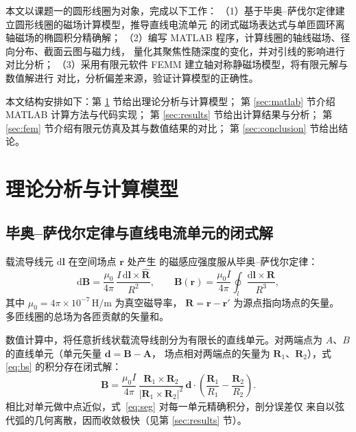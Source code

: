 \documentclass[zihao=-4,a4paper]{ctexart}
\numberwithin{figure}{section}
\numberwithin{table}{section}
\numberwithin{equation}{section}
\begin{document}
本文以课题一的圆形线圈为对象，完成以下工作：
（1）基于毕奥--萨伐尔定律建立圆形线圈的磁场计算模型，推导直线电流单元
的闭式磁场表达式与单匝圆环离轴磁场的椭圆积分精确解；
（2）编写 MATLAB 程序，计算线圈的轴线磁场、径向分布、截面云图与磁力线，
量化其聚焦性随深度的变化，并对引线的影响进行对比分析；
（3）采用有限元软件 FEMM 建立轴对称静磁场模型，将有限元解与数值解进行
对比，分析偏差来源，验证计算模型的正确性。

本文结构安排如下：第 \ref{sec:model} 节给出理论分析与计算模型；
第 \ref{sec:matlab} 节介绍 MATLAB 计算方法与代码实现；
第 \ref{sec:results} 节给出计算结果与分析；
第 \ref{sec:fem} 节介绍有限元仿真及其与数值结果的对比；
第 \ref{sec:conclusion} 节给出结论。

\clearpage
\section{理论分析与计算模型}\label{sec:model}

\subsection{毕奥--萨伐尔定律与直线电流单元的闭式解}

载流导线元 $\mathrm{d}\boldsymbol{l}$ 在空间场点 $\boldsymbol{r}$ 处产生
的磁感应强度服从毕奥--萨伐尔定律：
\begin{equation}
  \mathrm{d}\boldsymbol{B}
  = \frac{\mu_0}{4\pi}\,\frac{I\,\mathrm{d}\boldsymbol{l}\times\hat{\boldsymbol{R}}}{R^2},
  \qquad
  \boldsymbol{B}(\boldsymbol{r}) = \frac{\mu_0 I}{4\pi}
  \oint_l \frac{\mathrm{d}\boldsymbol{l}\times\boldsymbol{R}}{R^3},
  \label{eq:bs}
\end{equation}
其中 $\mu_0 = 4\pi\times10^{-7}\,\mathrm{H/m}$ 为真空磁导率，
$\boldsymbol{R} = \boldsymbol{r}-\boldsymbol{r}'$ 为源点指向场点的矢量。
多匝线圈的总场为各匝贡献的矢量和。

数值计算中，将任意折线状载流导线剖分为有限长的直线单元。对两端点为
$A$、$B$ 的直线单元（单元矢量 $\boldsymbol{d}=\boldsymbol{B}-\boldsymbol{A}$，
场点相对两端点的矢量为 $\boldsymbol{R}_1$、$\boldsymbol{R}_2$），式
\eqref{eq:bs} 的积分存在闭式解：
\begin{equation}
  \boldsymbol{B} = \frac{\mu_0 I}{4\pi}\,
  \frac{\boldsymbol{R}_1\times\boldsymbol{R}_2}
       {\left|\boldsymbol{R}_1\times\boldsymbol{R}_2\right|^2}\,
  \boldsymbol{d}\cdot
  \left(\frac{\boldsymbol{R}_1}{R_1} - \frac{\boldsymbol{R}_2}{R_2}\right).
  \label{eq:seg}
\end{equation}
相比对单元做中点近似，式~\eqref{eq:seg} 对每一单元精确积分，剖分误差仅
来自以弦代弧的几何离散，因而收敛极快（见第 \ref{sec:results} 节）。
\end{document}
